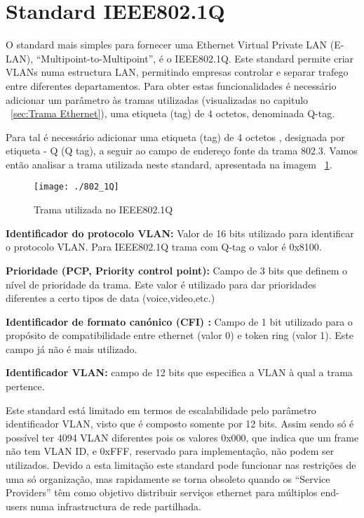 \documentclass[a4paper]{IEEEtran}
\begin{document}
\section{Standard IEEE802.1Q}
\label{sec:802.1Q}

O standard mais simples para fornecer uma Ethernet Virtual Private LAN (E-LAN), “Multipoint-to-Multipoint”, é o IEEE802.1Q. Este standard permite criar VLANs numa estructura LAN, permitindo empresas controlar e separar trafego entre diferentes departamentos.
Para obter estas funcionalidades é necessário adicionar um parâmetro às tramas utilizadas (visualizadas no capitulo ~\ref{sec:Trama Ethernet}), uma etiqueta (tag) de 4 octetos, denominada Q-tag.

Para tal é necessário adicionar uma etiqueta (tag) de 4 octetos , designada por etiqueta - Q (Q tag), a seguir ao campo de endereço fonte da trama 802.3. Vamos então analisar a trama utilizada neste standard, apresentada na imagem ~\ref{fig:TramaQ}.

\begin{figure}[htp]
	\centering
	\texttt{[image: ./802\_1Q]}
	\caption{Trama utilizada no IEEE802.1Q}
	\label{fig:TramaQ}
\end{figure}

\textbf{Identificador do protocolo VLAN:} Valor de 16 bits utilizado para identificar o protocolo VLAN. Para  IEEE802.1Q trama com Q-tag o valor é 0x8100.

\textbf{Prioridade (PCP, Priority control point):} Campo de 3 bits que definem o nível de prioridade da trama. Este valor é utilizado para dar prioridades diferentes a certo tipos de data (voice,video,etc.)

\textbf{Identificador de formato canónico (CFI) :} Campo de 1 bit utilizado para o propósito de compatibilidade entre ethernet (valor 0)  e token ring (valor 1). Este campo já não é mais utilizado.

\textbf{Identificador VLAN:} campo de 12 bits que especifica a VLAN à qual a trama pertence.

Este standard está limitado em termos de escalabilidade pelo parâmetro identificador VLAN, visto que é composto somente por 12 bits. Assim sendo só é possível ter 4094 VLAN diferentes pois os valores 0x000, que indica que um frame não tem VLAN ID, e 0xFFF, reservado para implementação, não podem ser utilizados.
Devido a esta limitação este standard pode funcionar nas restrições de uma só organização, mas rapidamente se torna obsoleto quando os “Service Providers” têm como objetivo distribuir serviços ethernet para múltiplos end-users numa infrastructura de rede partilhada.
\end{document}
